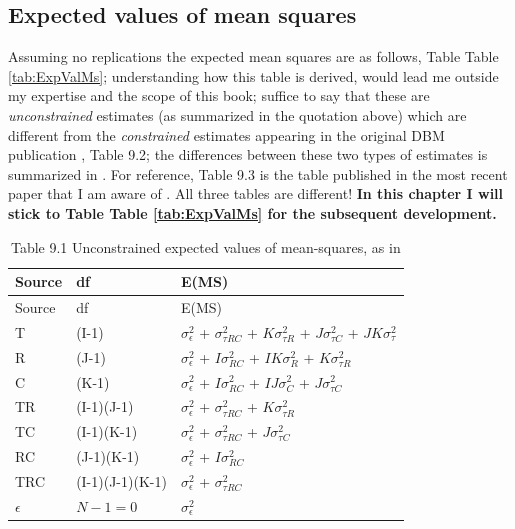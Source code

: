 \documentclass[
]{book}
\begin{document}
\hypertarget{expected-values-of-mean-squares-1}{%
\subsection{Expected values of mean squares}\label{expected-values-of-mean-squares-1}}

Assuming no replications the expected mean squares are as follows, Table Table \ref{tab:ExpValMs}; understanding how this table is derived, would lead me outside my expertise and the scope of this book; suffice to say that these are \emph{unconstrained} estimates (as summarized in the quotation above) which are different from the \emph{constrained} estimates appearing in the original DBM publication \citep{RN204}, Table 9.2; the differences between these two types of estimates is summarized in \citep{RN2079}. For reference, Table 9.3 is the table published in the most recent paper that I am aware of \citep{RN2508}. All three tables are different! \textbf{In this chapter I will stick to Table Table \ref{tab:ExpValMs} for the subsequent development.}

\begin{longtable}[]{@{}lll@{}}
\caption{Table 9.1 Unconstrained expected values of mean-squares, as in \citep{RN2079}}\tabularnewline
\toprule
Source & df & E(MS)\tabularnewline
\midrule
\endfirsthead
\toprule
Source & df & E(MS)\tabularnewline
\midrule
\endhead
T & (I-1) & \(\sigma_{\epsilon}^{2}\) + \(\sigma_{\tau RC}^{2}\) + \(K\sigma_{\tau R}^{2}\) + \(J\sigma_{\tau C}^{2}\) + \(JK\sigma_{\tau}^{2}\)\tabularnewline
R & (J-1) & \(\sigma_{\epsilon}^{2}\) + \(I\sigma_{RC}^{2}\) + \(IK\sigma_{R}^{2}\) + \(K\sigma_{\tau R}^{2}\)\tabularnewline
C & (K-1) & \(\sigma_{\epsilon}^{2}\) + \(I\sigma_{RC}^{2}\) + \(IJ\sigma_{C}^{2}\) + \(J\sigma_{\tau C}^{2}\)\tabularnewline
TR & (I-1)(J-1) & \(\sigma_{\epsilon}^{2}\) + \(\sigma_{\tau RC}^{2}\) + \(K\sigma_{\tau R}^{2}\)\tabularnewline
TC & (I-1)(K-1) & \(\sigma_{\epsilon}^{2}\) + \(\sigma_{\tau RC}^{2}\) + \(J\sigma_{\tau C}^{2}\)\tabularnewline
RC & (J-1)(K-1) & \(\sigma_{\epsilon}^{2}\) + \(I\sigma_{RC}^{2}\)\tabularnewline
TRC & (I-1)(J-1)(K-1) & \(\sigma_{\epsilon}^{2}\) + \(\sigma_{\tau RC}^{2}\)\tabularnewline
\(\epsilon\) & \(N-1=0\) & \(\sigma_{\epsilon}^{2}\)\tabularnewline
\bottomrule
\end{longtable}
\end{document}
